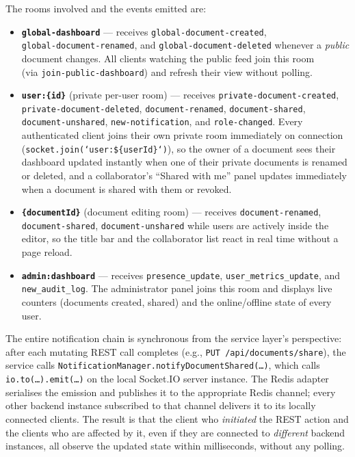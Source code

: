\documentclass{scrartcl}
\begin{document}
  The rooms involved and the events emitted are:
  \begin{itemize}
    \item \textbf{\texttt{global-dashboard}} --- receives \texttt{global-document-created},\\
    \texttt{global-document-renamed}, and \texttt{global-document-deleted} whenever a
    \emph{public} document changes. All clients watching the public feed join this room \\
    (via \texttt{join-public-dashboard}) and refresh their view without polling.

    \item \textbf{\texttt{user:\{id\}}} (private per-user room) --- receives
    \texttt{private-document-created},\\ \texttt{private-document-deleted},
    \texttt{document-renamed}, \texttt{document-shared},\\ \texttt{document-unshared},
    \texttt{new-notification}, and \texttt{role-changed}. Every authenticated client joins
    their own private room immediately on connection \\
    (\texttt{socket.join(`user:\$\{userId\}`)}), so the owner of a document sees their
    dashboard updated instantly when one of their private documents is renamed or deleted, and
    a collaborator's ``Shared with me'' panel updates immediately when a document is shared
    with them or revoked.

    \item \textbf{\texttt{\{documentId\}}} (document editing room) --- receives
    \texttt{document-renamed},\\ \texttt{document-shared}, \texttt{document-unshared} while
    users are actively inside the editor, so the title bar and the collaborator list react in
    real time without a page reload.

    \item \textbf{\texttt{admin:dashboard}} --- receives \texttt{presence\_update},
    \texttt{user\_metrics\_update}, and \\ \texttt{new\_audit\_log}. The administrator panel
    joins this room and displays live counters (documents created, shared) and the online/offline
    state of every user.
  \end{itemize}

  The entire notification chain is synchronous from the service layer's perspective: after each
  mutating REST call completes (e.g., \texttt{PUT /api/documents/share}), the service calls
  \texttt{NotificationManager.notifyDocumentShared(\ldots)}, which calls
  \texttt{io.to(\ldots).emit(\ldots)} on the local Socket.IO server instance. The Redis adapter
  serialises the emission and publishes it to the appropriate Redis channel; every other backend
  instance subscribed to that channel delivers it to its locally connected clients. The result is
  that the client who \emph{initiated} the REST action and the clients who are affected by it, even
  if they are connected to \emph{different} backend instances, all observe the updated state within
  milliseconds, without any polling.
\end{document}
